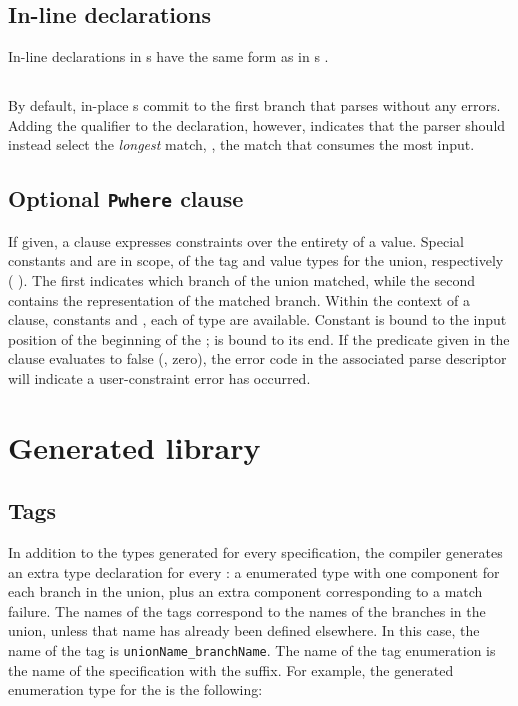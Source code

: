 \subsection{In-line declarations}
\label{sec:unions-inline}
In-line declarations in \Punion{}s have the same form as in
\Pstruct{}s \cf{} .

\subsection{\Plongest{}}
By default, in-place \Punion{}s commit to the first branch that parses
without any errors. Adding the \Plongest{} qualifier to the
\Punion{} declaration, however, indicates that the parser should
instead select the \textit{longest} match, \ie{}, the match that
consumes the most input. 

\subsection{Optional \texttt{Pwhere} clause}
If given, a \Pwhere{} clause expresses constraints over the entirety
of a \Punion{} value.  Special constants  and  are
in scope, of the tag and value types for the union, respectively
(\cf{} ).  The
first indicates which branch of the union matched, while the second
contains the representation of the matched branch. 
Within the context of a 
\Pparsecheck{} clause, constants  and , each of type 
\Ppost{} are available.  Constant  is bound to the input
position of the beginning of the \punion{};  is bound to its end.
If the predicate given in
the \Pwhere{} clause evaluates to false (\ie{}, zero), the error code
in the associated parse descriptor will indicate a user-constraint
error has occurred.  

\section{Generated library}
\subsection{Tags}
\label{sec:unions-tags}
In addition to the types generated for every \pads{} specification,
the \pads{} compiler generates an extra type 
declaration for every \Punion{}: a enumerated type with one component
for each branch in the union, plus an extra component corresponding to
a match failure.  The names of the tags correspond to the names of the
branches in the union, unless that name
has already been defined 
elsewhere.  In this case, the name of the tag is 
\texttt{unionName\_branchName}.  
The name of the tag enumeration is the name of
the \pads{} specification with the  suffix.
For example, the generated enumeration type
for the \Punion{}  is the following:

%


